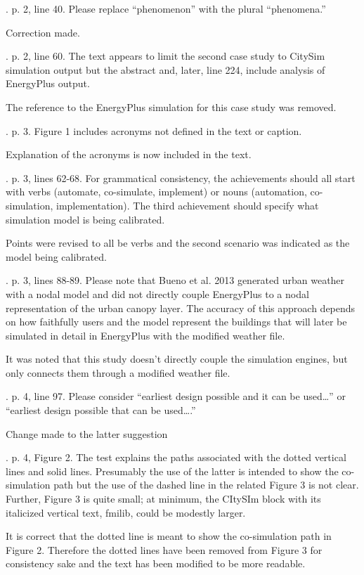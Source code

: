 \documentclass[answers,12pt]{exam}
\begin{document}
\begin{questions}
. p. 2, line 40.  Please replace “phenomenon” with the plural “phenomena.” 
\begin{solution}
Correction made.
\end{solution}

. p. 2, line 60.  The text appears to limit the second case study to CitySim simulation output but the abstract and, later, line 224, include analysis of EnergyPlus output. 
\begin{solution}
The reference to the EnergyPlus simulation for this case study was removed.
\end{solution}

. p. 3.  Figure 1 includes acronyms not defined in the text or caption. 
\begin{solution}
Explanation of the acronyms is now included in the text.
\end{solution}

. p. 3, lines 62-68.  For grammatical consistency, the achievements should all start with verbs (automate, co-simulate, implement) or nouns (automation, co-simulation, implementation).  The third achievement should specify what simulation model is being calibrated. 
\begin{solution}
Points were revised to all be verbs and the second scenario was indicated as the model being calibrated.
\end{solution}

. p. 3, lines 88-89.  Please note that Bueno et al. 2013 generated urban weather with a nodal model and did not directly couple EnergyPlus to a nodal representation of the urban canopy layer.  The accuracy of this approach depends on how faithfully users and the model represent the buildings that will later be simulated in detail in EnergyPlus with the modified weather file. 
\begin{solution}
It was noted that this study doesn't directly couple the simulation engines, but only connects them through a modified weather file.
\end{solution}

. p. 4, line 97.  Please consider “earliest design possible and it can be used…” or “earliest design possible that can be used….” 
\begin{solution}
Change made to the latter suggestion
\end{solution}

. p. 4, Figure 2. The test explains the paths associated with the dotted vertical lines and solid lines.  Presumably the use of the latter is intended to show the co-simulation path but the use of the dashed line in the related Figure 3 is not clear.  Further, Figure 3 is quite small; at minimum, the CItySIm block with its italicized vertical text, fmilib, could be modestly larger.  
\begin{solution}
It is correct that the dotted line is meant to show the co-simulation path in Figure 2. Therefore the dotted lines have been removed from Figure 3 for consistency sake and the text has been modified to be more readable.
\end{solution}


\end{questions}
\end{document}
